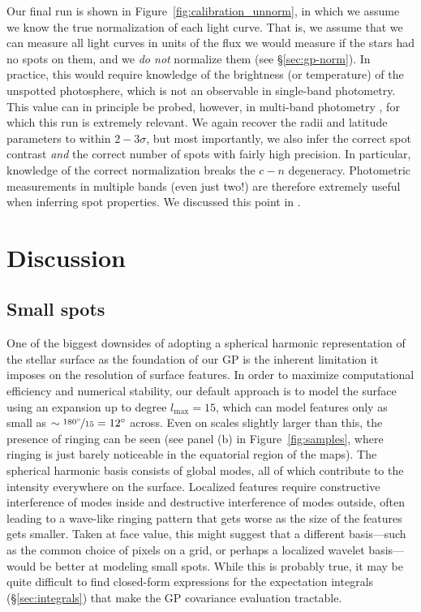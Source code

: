 \documentclass[modern,linenumbers]{aastex62}
\begin{document}
Our final run is shown in Figure~\ref{fig:calibration_unnorm}, in which
we assume we know the true normalization of each light curve. That is, we
assume that we can measure all light curves in units of the flux we would
measure if the stars had no spots on them, and we \emph{do not}
normalize them (see \S\ref{sec:gp-norm}). In practice, this would require
knowledge of the brightness (or temperature) of the unspotted
photosphere, which is not an observable in single-band photometry.
This value can in principle be probed, however, in multi-band photometry
\citep[e.g.,][]{Gully2017,Guo2018}, for which this run is
extremely relevant. We again recover the radii and latitude parameters
to within $2-3\sigma$, but most importantly, we also infer the correct
spot contrast \emph{and} the correct number of spots with fairly high
precision. In particular, knowledge of the correct normalization breaks the $c-n$ degeneracy.
Photometric measurements in multiple bands (even just two!)
are therefore extremely useful when inferring spot properties.
We discussed this point in .

\section{Discussion}
\label{sec:discussion}

\subsection{Small spots}
\label{sec:tinyspots}

One of the biggest downsides of adopting a spherical harmonic representation
of the stellar surface as the foundation of our GP is the inherent limitation
it imposes on the resolution of surface features. In order to maximize
computational efficiency and numerical stability, our default approach is to
model the surface using an expansion up to degree $l_\mathrm{max} = 15$,
which can model features only as small as
$\sim \nicefrac{180^\circ}{15} = 12^\circ$ across. Even on scales
slightly larger than this, the presence of ringing can be seen
(see panel (b) in Figure~\ref{fig:samples}, where ringing is just barely
noticeable in the equatorial region of the maps). The spherical harmonic basis consists
of global modes, all of which contribute to the intensity everywhere on the surface.
Localized features require constructive interference of modes inside
and destructive interference of modes outside, often leading to a wave-like ringing
pattern that gets worse as the size of the features gets smaller. Taken at
face value, this might suggest that a different basis---such as the common
choice of pixels on a grid, or perhaps a localized wavelet basis---would be better
at modeling small spots. While this is probably true, it may be quite
difficult to find closed-form expressions for the expectation integrals
(\S\ref{sec:integrals}) that make the GP covariance evaluation tractable.
\end{document}
